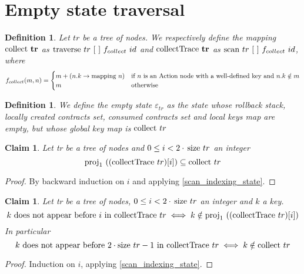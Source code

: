 \documentclass{article}
\newtheorem{definition}[lemma]{Definition}
\newtheorem{claim}[lemma]{Claim}
\newcommand{\textfun}[1]{\textup{#1}}
\newcommand{\bolddef}[1]{\textbf{\ensuremath{\mathbf{#1}}}}
\newcommand{\fcoll}[2]{\ensuremath{f_{collect}(#1, #2)}}
\newcommand{\emptyList}{\ensuremath{[\ ]}}
\newcommand{\longtraverse}[4]{\textfun{traverse}\ #1\ #2\ #3 \ #4}
\newcommand{\longscan}[4]{\textfun{scan}\ #1\ #2\ #3 \ #4}
\newcommand{\collect}[1]{\textfun{collect}\ #1}
\newcommand{\collectTr}[1]{\textfun{collectTrace}\ #1}
\newcommand{\mapping}[1]{\textfun{mapping}\ #1}
\newcommand{\size}[1]{\textfun{size}\ #1}
\newcommand{\fst}[1]{\textfun{proj}_1\ #1}
\newcommand{\emptyState}[1]{\varepsilon_{#1}}
\begin{document}
\section*{Empty state traversal}

\begin{definition}
    Let $tr$ be a tree of nodes. 
    We respectively define the mapping \bolddef{\collect{tr}} as $\longtraverse{tr}{\emptyList}{f_{collect}}{id}$ and \bolddef{\collectTr{tr}} as
    $\longscan{tr}{\emptyList}{f_{collect}}{id}$, where
    \[\fcoll{m}{n} = 
        \begin{cases} 
            m + (n.k \to \mapping{n}) &\text{if $n$ is an Action node with a well-defined key and $n.k \notin m$} \\
            m &\text{otherwise}
         \end{cases} \] 
\end{definition}

\begin{definition}
    We define the empty state $\emptyState{tr}$ as the state whose rollback stack, locally created contracts set, consumed contracts set and local keys map are empty, 
    but whose global key map is $\collect{tr}$
\end{definition}

\begin{claim}
    \label{collect_submap}
    Let tr be a tree of nodes and $0 \leq i < 2 \cdot \, \size{tr}$ an integer
    \[\fst{((\collectTr{tr})[i])} \subseteq \collect{tr}\] 
\end{claim}

\begin{proof}
    By backward induction on $i$ and applying \cref{scan_indexing_state}.
\end{proof}

\begin{claim}
    \label{collect_not_contains}
    Let tr be a tree of nodes, $0 \leq i < 2 \cdot \, \size{tr}$ an integer and $k$ a key. 
    \[k \text{ does not appear before } i \text{ in } \collectTr{tr} \iff k \notin \fst{((\collectTr{tr})[i])}\] 
    In particular
    \[k \text{ does not appear before } 2 \cdot \size{tr} - 1 \text{ in } \collectTr{tr} \iff k \notin \collect{tr}\]
\end{claim}

\begin{proof}
    Induction on $i$, applying \cref{scan_indexing_state}.
\end{proof}
\end{document}
